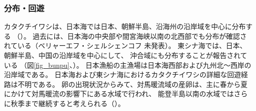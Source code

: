 \subsubsection{分布・回遊}
カタクチイワシは、日本海では日本、朝鮮半島、沿海州の沿岸域を中心に分布する
（\citealt{Ochiai1986}）。
過去には、日本海の中央部や間宮海峡以南の北西部でも分布が確認されている（ベリャーエフ・シェルシェンコフ 未発表）。
東シナ海では、日本、朝鮮半島、中国の沿岸域を中心にして、
沖合域にも分布することが報告されている
（図\ref{fig_bunpu}、\citealt{Iversen1993, Ohshimo1996}）。
日本漁船の主漁場は日本海西部および九州北～西岸の沿岸域である。
日本海および東シナ海におけるカタクチイワシの詳細な回遊経路は不明である。
卵の出現状況からみて、対馬暖流域の産卵は、主に春から夏にかけて対馬暖流の影響下にある水域で行われ、
能登半島以南の水域ではさらに秋季まで継続すると考えられる（\citealt{Uchida1958}）。
